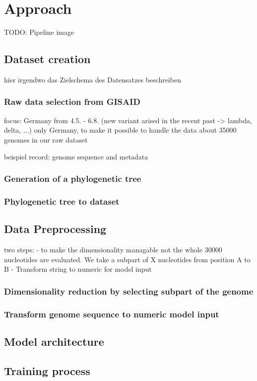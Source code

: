 \section{Approach} 
\label{approach}

TODO: Pipeline image

\subsection{Dataset creation} 
\label{ch:approachA}

hier irgendwo das Zielschema des Datensatzes beschreiben

\subsubsection{Raw data selection from GISAID}
\label{ch:approachAa}

focus: Germany from 4.5. - 6.8. (new variant arised in the recent past -> lambda, delta, ...)
only Germany, to make it possible to handle the data
about 35000 genomes in our raw dataset

beispiel record: genome sequence and metadata


\subsubsection{Generation of a phylogenetic tree}
\label{ch:approachAb}


\subsubsection{Phylogenetic tree to dataset}
\label{ch:approachAc}


\subsection{Data Preprocessing} 
\label{ch:approachB}

two steps:
- to make the dimensionality managable not the whole 30000 nucleotides are evaluated. We take a subpart of X nucleotides from position A to B
- Transform string to numeric for model input

\subsubsection{Dimensionality reduction by selecting subpart of the genome}
\label{ch:approachBa}


\subsubsection{Transform genome sequence to numeric model input}
\label{ch:approachBb}



\subsection{Model architecture} 
\label{ch:approachC}

\subsection{Training process} 
\label{ch:approachD}


\newpage
